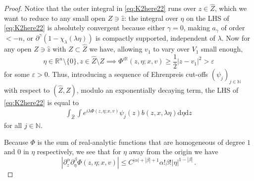 \documentclass[
	fontsize=11pt, 
	twoside=false, 
	abstract=true, 
	a4paper,
]{scrartcl}
\newcommand{\eps}{\varepsilon}
\newcommand{\sem}{\setminus\{0\}}
\newcommand{\RR}{\mathbb{R}}
\newcommand{\dd}{\mathrm{d}}
\newcommand{\abs}[1]{\left\lvert#1\right\rvert}
\newcommand{\del}{\partial}
\newcommand{\td}[1]{\tilde{#1}}
\begin{document}
\begin{proof}
	Notice that the outer integral in \cref{eq:K2here22} runs over $z\in\hat Z$, which we want to reduce to any small open $Z \ni \hat z$: the integral over $\eta$ on the LHS of \cref{eq:K2here22} is absolutely convergent because either $\gamma =0$, making $a_\gamma$ of order $<-n$, or $\del^\gamma(1-\chi_\lambda(\lambda\eta))$ is compactly supported, independent of $\lambda$. Now for any open $Z\ni \hat z$ with $Z \subset \hat Z$ we have, allowing $v_1$ to vary over $V_1$ small enough, 
	\[
		\eta\in\RR^n\sem, z\in \hat Z\setminus Z \implies \Phi^{i\RR}(z,\eta;x,v) \geq \frac{1}{2}\abs{z-v_1}^2 > \eps
	\]
	for some $\eps > 0$. Thus, introducing a sequence of Ehrenpreis cut-offs $(\psi_j)_{j\in\mathbb{N}}$ with respect to $(\hat Z,Z)$, modulo an exponentially decaying term, %
	the LHS of \cref{eq:K2here22} is equal to %
	\begin{equation}
		\begin{aligned}\label{eq:K2here3}
		\int_{\hat Z}\int e^{i\lambda\Phi(z,\eta;x,v)}\psi_j(z)b(z,x,\lambda\eta)\dd\eta\dd z	%
	\end{aligned}
\end{equation}
	for all $j\in\mathbb{N}$. %

	Because $\Phi$ is the sum of real-analytic functions that are homogeneous of degree $1$ and $0$ in $\eta$ respectively, we see that for $\eta$ away from the origin we have
	\begin{equation}\label{eq:Phigood}
		\abs{\del^\alpha_z\del^\beta_\eta \Phi(z,\eta;x,v)} \leq C^{\abs{\alpha}+\abs{\beta}+1}\alpha!\beta!\abs{\eta}^{1-\abs{\beta}}\,.
	\end{equation}


\end{proof}
\end{document}
